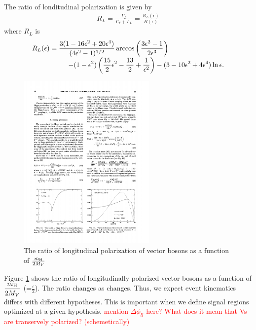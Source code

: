 The ratio of londitudinal polarization is given \cite{PhysRevD.49.79} by 
\begin{eqnarray} 
R_L 
=
\frac{\Gamma_L}{\Gamma_T + \Gamma_L}    
= 
\frac{R_L(\epsilon)}{R(\epsilon)}  
\end{eqnarray} 
where $R_L$ is \cite{PhysRevD.49.79} 
\begin{eqnarray} 
\begin{array}{ccc} \multicolumn{2}{c}{\displaystyle 
R_L(\epsilon) = \frac{3(1-16\epsilon^2+20\epsilon^4)}{(4\epsilon^2-1)^{1/2}} 
                \arccos \left( \frac{3\epsilon^2-1}{2\epsilon^3} \right)  
} & \\ & \multicolumn{2}{c}{\hspace{1.5cm} \displaystyle
- (1-\epsilon^2)\left( \frac{15}{2}\epsilon^2 - \frac{13}{2} + \frac{1}{\epsilon^2} \right)  
- (3-10\epsilon^2+4\epsilon^4) \ln \epsilon.
} \end{array}      
\end{eqnarray} 

\begin{figure}[t]
\centering
\includegraphics[width=0.6\textwidth]{figures/HVV_polarization_ratio.pdf}
\caption{The ratio of longitudinal polarization of vector bosons 
as a function of $\frac{m_{\mathrm{H}}}{2M_V}$ \cite{PhysRevD.49.79} }
\label{fig:HVV_polarization_ratio}
\end{figure}
Figure \ref{fig:HVV_polarization_ratio} shows the ratio of longitudinally 
polarized vector bosons as a function of $\displaystyle \frac{m_{\mathrm{H}}}{2M_V}$
(=$\displaystyle \frac{\epsilon}{2}$). 
The ratio changes as \mHi{} changes. Thus, we expect event kinematics differs 
with different \mHi{} hypotheses. This is important when we define signal 
regions optimized at a given \mHi{} hypothesis.  
\textcolor{red}{mention $\Delta\phi_{ll}$ here? What does it mean that 
Vs are transervely polarized? (schemetically)}


